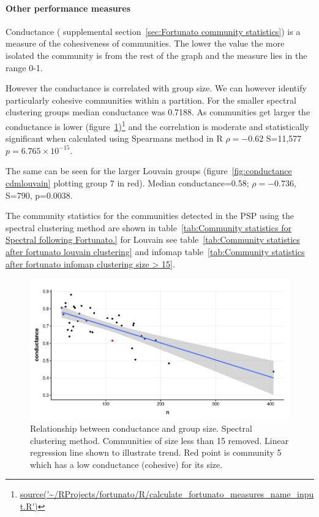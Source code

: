  


\paragraph{Other performance measures}

Conductance ( supplemental section~\ref{sec:Fortunato community statistics}) is a measure of the cohesiveness of communities\cite{fortunato2016community}. The lower the value the more isolated the community is from the rest of the graph and the measure lies in the range 0-1.

However the conductance is correlated with group size. We can however identify particularly cohesive communities within a partition. For the smaller spectral clustering groups median conductance was 0.7188. As communities get larger the conductance is lower (figure~\ref{fig:conductance cdm})\footnote{\url{source('~/RProjects/fortunato/R/calculate_fortunato_measures_name_input.R')}} and the correlation is moderate and statistically significant when calculated using Spearmans method in R $\rho=-0.62$ S=11,577 $p=6.765 \times 10^{-15}$.

The same can be seen for the larger Louvain groups (figure~\ref{fig:conductance cdmlouvain} plotting group 7 in red). Median conductance=0.58; $\rho=-0.736$,  S=790, p=0.0038. 

The community statistics for the communities detected in the PSP using the spectral clustering method are shown in table~\ref{tab:Community statistics for Spectral following Fortunato.} for Louvain see
 table~\ref{tab:Community statistics after fortunato louvain clustering} and infomap table~\ref{tab:Community statistics after fortunato infomap clustering size > 15}.



\begin{figure}
    \centering
    \includegraphics[width=\textwidth]{images/chapter_community_detection/ggplot2/conductance/Rplot_conductance_eigenvec.png}
    \caption{Relationship between conductance and group size. Spectral clustering method. Communities of size less than 15 removed. Linear regression line shown to illustrate trend. Red point is community 5 which has a low conductance (cohesive) for its size. }
    \label{fig:conductance cdm}
\end{figure}

